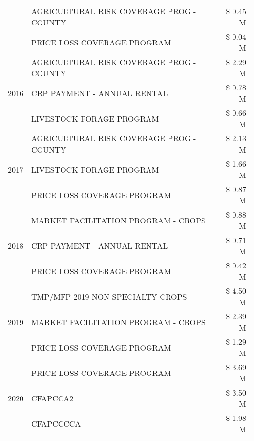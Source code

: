 \begin{tabular}{llr}
 & AGRICULTURAL RISK COVERAGE PROG - COUNTY & \$ 0.45 M \\
 & PRICE LOSS COVERAGE PROGRAM & \$ 0.04 M \\
\cline{1-3}
\multirow[t]{3}{*}{2016} & AGRICULTURAL RISK COVERAGE PROG - COUNTY      & \$ 2.29 M \\
 & CRP PAYMENT - ANNUAL RENTAL                   & \$ 0.78 M \\
 & LIVESTOCK FORAGE PROGRAM                      & \$ 0.66 M \\
\cline{1-3}
\multirow[t]{3}{*}{2017} & AGRICULTURAL RISK COVERAGE PROG - COUNTY & \$ 2.13 M \\
 & LIVESTOCK FORAGE PROGRAM & \$ 1.66 M \\
 & PRICE LOSS COVERAGE PROGRAM & \$ 0.87 M \\
\cline{1-3}
\multirow[t]{3}{*}{2018} & MARKET FACILITATION PROGRAM - CROPS & \$ 0.88 M \\
 & CRP PAYMENT - ANNUAL RENTAL & \$ 0.71 M \\
 & PRICE LOSS COVERAGE PROGRAM & \$ 0.42 M \\
\cline{1-3}
\multirow[t]{3}{*}{2019} & TMP/MFP 2019 NON SPECIALTY CROPS & \$ 4.50 M \\
 & MARKET FACILITATION PROGRAM - CROPS & \$ 2.39 M \\
 & PRICE LOSS COVERAGE PROGRAM & \$ 1.29 M \\
\cline{1-3}
\multirow[t]{3}{*}{2020} & PRICE LOSS COVERAGE PROGRAM & \$ 3.69 M \\
 & CFAPCCA2 & \$ 3.50 M \\
 & CFAPCCCCA & \$ 1.98 M \\
\cline{1-3}
\bottomrule
\end{tabular}
